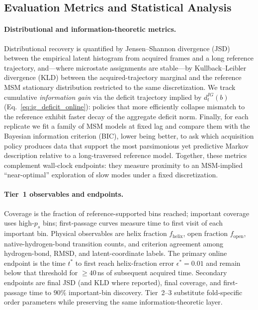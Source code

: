 \documentclass[journal=jctcce,manuscript=article,layout=twocolumn]{achemso}
\begin{document}
\subsection{Evaluation Metrics and Statistical Analysis}

\paragraph{Distributional and information-theoretic metrics.} Distributional recovery is quantified by Jensen--Shannon divergence (JSD) between the empirical latent histogram from acquired frames and a long reference trajectory, and---where microstate assignments are stable---by Kullback--Leibler divergence (KLD) between the acquired-trajectory marginal and the reference MSM stationary distribution restricted to the same discretization. We track cumulative \emph{information gain} via the deficit trajectory implied by $d^{IG}_t(b)$ (Eq.~\ref{eq:ig_deficit_online}): policies that more efficiently collapse mismatch to the reference exhibit faster decay of the aggregate deficit norm. Finally, for each replicate we fit a family of MSM models at fixed lag and compare them with the Bayesian information criterion (BIC), lower being better, to ask which acquisition policy produces data that support the most parsimonious yet predictive Markov description relative to a long-traversed reference model. Together, these metrics complement wall-clock endpoints: they measure proximity to an MSM-implied ``near-optimal'' exploration of slow modes under a fixed discretization.

\paragraph{Tier~1 observables and endpoints.} Coverage is the fraction of reference-supported bins reached; important coverage uses high-$p_s$ bins; first-passage curves measure time to first visit of each important bin. Physical observables are helix fraction $f_{\mathrm{helix}}$, open fraction $f_{\mathrm{open}}$, native-hydrogen-bond transition counts, and criterion agreement among hydrogen-bond, RMSD, and latent-coordinate labels. The primary online endpoint is the time $t^*$ to first reach helix-fraction error $\epsilon^*=0.01$ and remain below that threshold for $\geq 40$\,ns of subsequent acquired time. Secondary endpoints are final JSD (and KLD where reported), final coverage, and first-passage time to $90\%$ important-bin discovery. Tier~2--3 substitute fold-specific order parameters while preserving the same information-theoretic layer.
\end{document}
